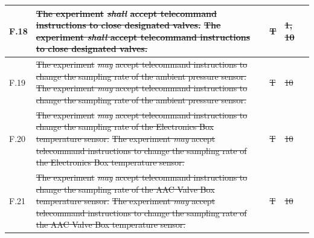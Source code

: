 \documentclass[a4paper,12pt,twoside]{article}
\providecommand{\DIFaddtex}[1]{{\protect\color{blue}\uwave{#1}}} %
\providecommand{\DIFdeltex}[1]{{\protect\color{red}\sout{#1}}}                      %
\providecommand{\DIFaddbegin}{} %
\providecommand{\DIFaddend}{} %
\providecommand{\DIFdelbegin}{} %
\providecommand{\DIFdelend}{} %
\providecommand{\DIFadd}[1]{\texorpdfstring{\DIFaddtex{#1}}{#1}} %
\providecommand{\DIFdel}[1]{\texorpdfstring{\DIFdeltex{#1}}{}} %
\newcommand{\DIFscaledelfig}{0.5}
\newlength{\DIFdelgraphicswidth} %
\newlength{\DIFdelgraphicsheight} %
\newcommand{\DIFaddincludegraphics}[2][]{{\color{blue}\fbox{\DIFOincludegraphics[#1]{#2}}}} %
\newcommand{\DIFdelincludegraphics}[2][]{%
\sbox{\DIFdelgraphicsbox}{\DIFOincludegraphics[#1]{#2}}%
\settoboxwidth{\DIFdelgraphicswidth}{\DIFdelgraphicsbox} %
\settoboxtotalheight{\DIFdelgraphicsheight}{\DIFdelgraphicsbox} %
\scalebox{\DIFscaledelfig}{%
\parbox[b]{\DIFdelgraphicswidth}{\usebox{\DIFdelgraphicsbox}\\[-\baselineskip] \rule{\DIFdelgraphicswidth}{0em}}\llap{\resizebox{\DIFdelgraphicswidth}{\DIFdelgraphicsheight}{%
\setlength{\unitlength}{\DIFdelgraphicswidth}%
\begin{picture}(1,1)%
\thicklines\linethickness{2pt} %
{\color[rgb]{1,0,0}\put(0,0){\framebox(1,1){}}}%
{\color[rgb]{1,0,0}\put(0,0){\line( 1,1){1}}}%
{\color[rgb]{1,0,0}\put(0,1){\line(1,-1){1}}}%
\end{picture}%
}\hspace*{3pt}}} %
} %
\DeclareRobustCommand{\DIFaddbegin}{\DIFOaddbegin \let\includegraphics\DIFaddincludegraphics} %
\DeclareRobustCommand{\DIFaddend}{\DIFOaddend \let\includegraphics\DIFOincludegraphics} %
\DeclareRobustCommand{\DIFdelbegin}{\DIFOdelbegin \let\includegraphics\DIFdelincludegraphics} %
\DeclareRobustCommand{\DIFdelend}{\DIFOaddend \let\includegraphics\DIFOincludegraphics} %
\begin{document}
\begin{longtable}[]{|m{}| m{} |m{} |m{}|m{}|}
F.18 & \DIFdelbegin \DIFdel{The experiment }\textit{\DIFdel{shall}} %
\DIFdel{accept telecommand instructions to close designated valves.                                                                                        }\DIFdelend \DIFaddbegin \st{The experiment \textit{shall} accept telecommand instructions to close designated valves.}\DIFadd{\textsuperscript{\ref{fn:unnecessary-requirement}}                                                                                         }\DIFaddend &      \DIFdelbegin \DIFdel{T        }\DIFdelend \DIFaddbegin \DIFadd{-     }\DIFaddend & \DIFdelbegin \DIFdel{1, 10            }\DIFdelend \DIFaddbegin \DIFadd{-            }\DIFaddend &        \\ \hline
F.19 & \DIFdelbegin \DIFdel{The experiment }\textit{\DIFdel{may}} %
\DIFdel{accept telecommand instructions to change the sampling rate of the ambient pressure sensor.                                                          }\DIFdelend \DIFaddbegin \st{The experiment \textit{may} accept telecommand instructions to change the sampling rate of the ambient pressure sensor.}\DIFadd{\textsuperscript{\ref{fn:unnecessary-requirement}}                                                           }\DIFaddend &     \DIFdelbegin \DIFdel{T         }\DIFdelend \DIFaddbegin \DIFadd{-         }\DIFaddend & \DIFdelbegin \DIFdel{10            }\DIFdelend \DIFaddbegin \DIFadd{-          }\DIFaddend &        \\ \hline
F.20 & \DIFdelbegin \DIFdel{The experiment }\textit{\DIFdel{may}} %
\DIFdel{accept telecommand instructions to change the sampling rate of the Electronics Box temperature sensor.                                                       }\DIFdelend \DIFaddbegin \st{The experiment \textit{may} accept telecommand instructions to change the sampling rate of the Electronics Box temperature sensor.}\DIFadd{\textsuperscript{\ref{fn:unnecessary-requirement}}                                                        }\DIFaddend &      \DIFdelbegin \DIFdel{T        }\DIFdelend \DIFaddbegin \DIFadd{-       }\DIFaddend & \DIFdelbegin \DIFdel{10            }\DIFdelend \DIFaddbegin \DIFadd{-            }\DIFaddend &        \\ \hline
F.21 & \DIFdelbegin \DIFdel{The experiment }\textit{\DIFdel{may}} %
\DIFdel{accept telecommand instructions to change the sampling rate of the AAC Valve Box temperature sensor.                                                 }\DIFdelend \DIFaddbegin \st{The experiment \textit{may} accept telecommand instructions to change the sampling rate of the AAC Valve Box temperature sensor.}\DIFadd{\textsuperscript{\ref{fn:unnecessary-requirement}}                                                  }\DIFaddend &      \DIFdelbegin \DIFdel{T        }\DIFdelend \DIFaddbegin \DIFadd{-       }\DIFaddend & \DIFdelbegin \DIFdel{10            }\DIFdelend \DIFaddbegin \DIFadd{-            }\DIFaddend &        \\ \hline

\end{longtable}
\end{document}
